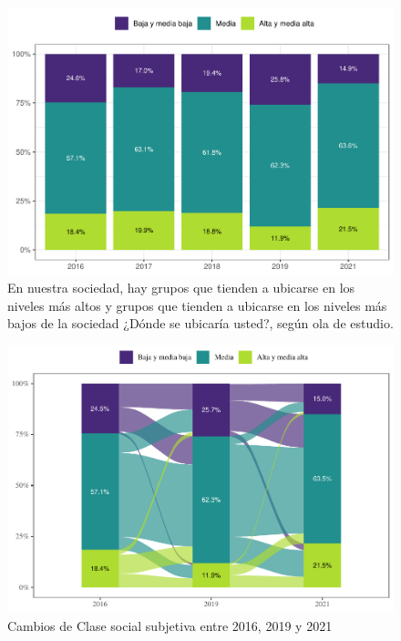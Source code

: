\documentclass[
  12pt,
  openany]{book}
\begin{document}
\begin{figure}

{\centering \includegraphics{reporte-elsoc_files/figure-latex/ess-ola-1} 

}

\caption{En nuestra sociedad, hay grupos que tienden a ubicarse en los niveles más altos y grupos que tienden a ubicarse en los niveles más bajos de la sociedad ¿Dónde se ubicaría usted?, según ola de estudio.}\label{fig:ess-ola}
\end{figure}

\begin{figure}

{\centering \includegraphics{reporte-elsoc_files/figure-latex/ess-cambio-1} 

}

\caption{Cambios de Clase social subjetiva entre 2016, 2019 y 2021}\label{fig:ess-cambio}
\end{figure}
\end{document}
